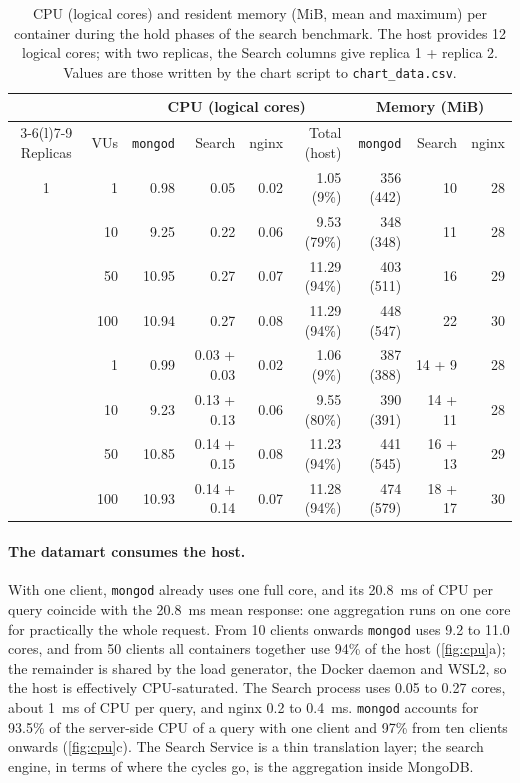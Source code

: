 \documentclass[10pt,a4paper]{article}
\newcommand{\code}[1]{\texttt{#1}}
\begin{document}
\begin{table}[htbp]
  \centering
  \footnotesize
  \caption{CPU (logical cores) and resident memory (MiB, mean and maximum) per
  container during the hold phases of the search benchmark. The host provides
  12 logical cores; with two replicas, the Search columns give replica 1 +
  replica 2. Values are those written by the chart script to
  \code{chart\_data.csv}.}
  \label{tab:resources}
  \begin{tabular}{@{}crrrrrrrr@{}}
    \toprule
    & & \multicolumn{4}{c}{CPU (logical cores)} & \multicolumn{3}{c}{Memory (MiB)} \\
    \cmidrule(lr){3-6}\cmidrule(l){7-9}
    Replicas & VUs & \code{mongod} & Search & nginx & Total (host) & \code{mongod} & Search & nginx \\
    \midrule
    1 & 1   & 0.98  & 0.05 & 0.02 & 1.05 (9\%)   & 356 (442) & 10      & 28 \\
      & 10  & 9.25  & 0.22 & 0.06 & 9.53 (79\%)  & 348 (348) & 11      & 28 \\
      & 50  & 10.95 & 0.27 & 0.07 & 11.29 (94\%) & 403 (511) & 16      & 29 \\
      & 100 & 10.94 & 0.27 & 0.08 & 11.29 (94\%) & 448 (547) & 22      & 30 \\
    \addlinespace
    2 & 1   & 0.99  & 0.03 + 0.03 & 0.02 & 1.06 (9\%)   & 387 (388) & 14 + 9  & 28 \\
      & 10  & 9.23  & 0.13 + 0.13 & 0.06 & 9.55 (80\%)  & 390 (391) & 14 + 11 & 28 \\
      & 50  & 10.85 & 0.14 + 0.15 & 0.08 & 11.23 (94\%) & 441 (545) & 16 + 13 & 29 \\
      & 100 & 10.93 & 0.14 + 0.14 & 0.07 & 11.28 (94\%) & 474 (579) & 18 + 17 & 30 \\
    \bottomrule
  \end{tabular}
\end{table}

\paragraph{The datamart consumes the host.}
With one client, \code{mongod} already uses one full core, and its 20.8~ms of
CPU per query coincide with the 20.8~ms mean response: one aggregation runs on
one core for practically the whole request. From 10 clients onwards
\code{mongod} uses 9.2 to 11.0 cores, and from 50 clients all containers
together use 94\% of the host (\cref{fig:cpu}a); the remainder is shared by the
load generator, the Docker daemon and WSL2, so the host is effectively
CPU-saturated. The Search process uses 0.05 to 0.27 cores, about 1~ms of CPU
per query, and nginx 0.2 to 0.4~ms. \code{mongod} accounts for 93.5\% of the
server-side CPU of a query with one client and 97\% from ten clients onwards
(\cref{fig:cpu}c). The Search Service is a thin translation layer; the search
engine, in terms of where the cycles go, is the aggregation inside MongoDB.
\end{document}
